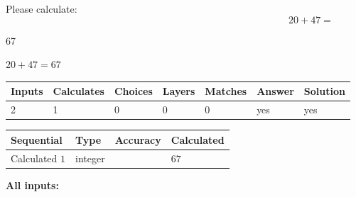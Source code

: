 \documentclass[12pt]{article}
\begin{document}
Please calculate:
\begin{equation}
20 +  %
47 = \nonumber
\end{equation}
 
 
 
\noindent{}
 
 

67
 
 
\noindent{}
 
 

 
 
 
\noindent{}
 
 

$ %
20 +  %
47=   %
67$
 
 
\noindent{}
 
 

 
   
   
   
   
\noindent\begin{tabular}{|l|l|l|l|l|l|l|}
 \hline
Inputs & Calculates & Choices & Layers & Matches & Answer & Solution \\ \hline
 2  & 
 1  & 
 0
  & 
 0  & 
 0  & 
  yes & 
  yes 
  \\ \hline
 \end{tabular}
   
   
   
   
\noindent{}
   
   
  
  
\noindent\begin{tabular}{|l|l|l|l|}
\hline
 Sequential & Type & Accuracy & Calculated \\ 
\hline
 
 
  Calculated $  1 $ & integer &  & 
  $ 67 $ 
 \\  \hline  
 \end{tabular}
   
   
   
   
\noindent\vspace{0.1in}\hspace{-0.08in} {\textbf{\Large{All inputs: }}}
   
   
  
\end{document}
